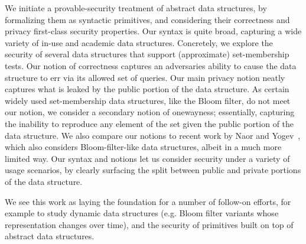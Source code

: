 We initiate a provable-security treatment of abstract data structures, by formalizing them as syntactic primitives, and considering their correctness and privacy first-class security properties.  Our syntax is quite broad, capturing a wide variety of in-use and academic data structures.  Concretely, we explore the security of several data structures that support (approximate) set-membership tests.  Our notion of correctness captures an adversaries ability to cause the data structure to err via its allowed set of queries.  Our main privacy notion neatly captures what is leaked by the public portion of the data structure.  As certain widely used set-membership data structures, like the Bloom filter, do not meet our notion, we consider a secondary notion of onewayness; essentially, capturing the inability to reproduce any element of the set given the public portion of the data structure.  We also compare our notions to recent work by Naor and Yogev~\cite{naor2015bloom}, which also considers Bloom-filter-like data structures, albeit in a much more limited way.  Our syntax and notions let us consider security under a variety of usage scenarios, by clearly surfacing the split between public and private portions of the data structure.

We see this work as laying the foundation for a number of follow-on efforts, for example to study dynamic data structures (e.g. Bloom filter variants whose representation changes over time), and the security of primitives built on top of abstract data structures.
